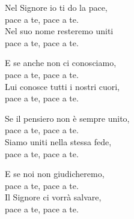 \documentclass[11pt]{book}
\begin{document}
\pagebreak
\settowidth{\versewidth}{Nel Signore io ti do la pace,}
\begin{canzone}%

Nel Signore io ti do la pace,\\
pace a te, pace a te.\\
Nel suo nome resteremo uniti\\
pace a te, pace a te.

E se anche non ci conosciamo,\\
pace a te, pace a te.\\
Lui conosce tutti i nostri cuori,\\
pace a te, pace a te.

Se il pensiero non è sempre unito,\\
pace a te, pace a te.\\
Siamo uniti nella stessa fede,\\
pace a te, pace a te.

E se noi non giudicheremo,\\
pace a te, pace a te.\\
Il Signore ci vorrà salvare,\\
pace a te, pace a te.
\end{canzone}
\newpage
{}
\end{document}
